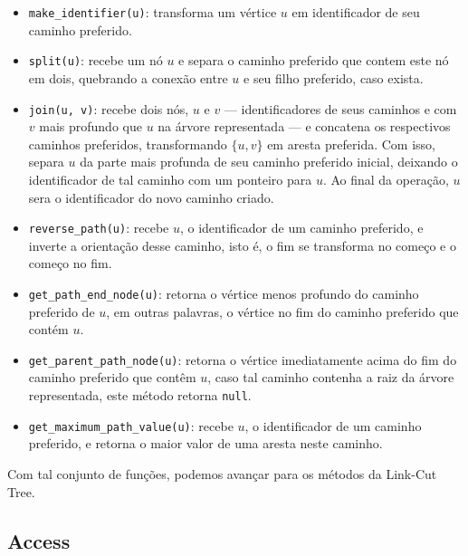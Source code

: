 \begin{itemize}
    \item \texttt{make\_identifier(u)}: transforma um vértice $u$ em identificador de seu caminho preferido.
    \item \texttt{split(u)}: recebe um nó $u$ e separa o caminho preferido que contem este nó em dois, quebrando a conexão entre $u$ e seu filho preferido, caso exista.
    \item \texttt{join(u, v)}: recebe dois nós, $u$ e $v$ --- identificadores de seus caminhos e com $v$ mais profundo que $u$ na árvore representada --- e concatena os respectivos caminhos preferidos, transformando $\{u,v\}$ em aresta preferida. Com isso, separa $u$ da parte mais profunda de seu caminho preferido inicial, deixando o identificador de tal caminho com um ponteiro para $u$. Ao final da operação, $u$ sera o identificador do novo caminho criado.
    \item \texttt{reverse\_path(u)}: recebe $u$, o identificador de um caminho preferido, e inverte a orientação desse caminho, isto é, o fim se transforma no começo e o começo no fim.
    \item \texttt{get\_path\_end\_node(u)}: retorna o vértice menos profundo do caminho preferido de $u$, em outras palavras, o vértice no fim do caminho preferido que contém $u$.
    \item \texttt{get\_parent\_path\_node(u)}: retorna o vértice imediatamente acima do fim do caminho preferido que contêm $u$, caso tal caminho contenha a raiz da árvore representada, este método retorna \texttt{null}.
    \item \texttt{get\_maximum\_path\_value(u)}:  recebe $u$, o identificador de um caminho preferido, e retorna o maior valor de uma aresta neste caminho.
\end{itemize}

Com tal conjunto de funções, podemos avançar para os métodos da Link-Cut Tree.

\subsection{Access}
\label{subsection:lct-access}

